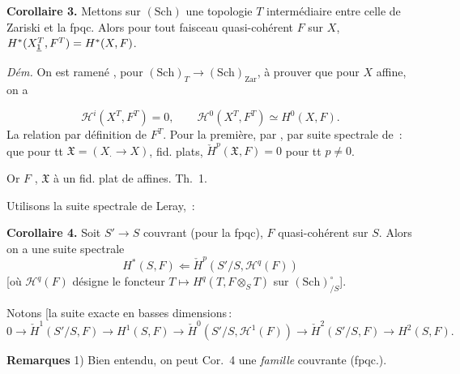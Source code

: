 \documentclass[11pt,a4paper]{article}
\begin{document}
\textbf{Corollaire 3.} Mettons sur $(\mathrm{Sch})$ une topologie $T$
intermédiaire entre celle de Zariski et la fpqc. Alors pour tout faisceau
quasi-cohérent $F$ sur $X$, $H^{*}(X^{T}_{\uncertain{\scriptstyle 1}}, F^{T})
= H^{*}(X, F)$.

\emph{Dém.} On est ramené , pour
$(\mathrm{Sch})_{T} \to (\mathrm{Sch})_{\mathrm{Zar}}$, à prouver que pour
$X$  affine, on a


\[
  \mathcal{H}^i(X^{T}, F^{T}) = 0, \qquad
  \mathcal{H}^0(X^{T}, F^{T}) \simeq H^0(X, F).
\]
 La \struck{\ill{}} relation  par
définition de $F^{T}$. Pour la première, \struck{\ill{}} \ill{}
 par \ill{} \ill{}, \ill{} \ill{} \ill{} par suite
spectrale de \,:  que pour tt
 \struck{\ill{}} \ill{} 
$\mathfrak{X} = (X_{\cdot} \to X)$, fid. plats,
$\check{H}^p(\mathfrak{X}, F) = 0$ pour tt $p \neq 0$.

Or \ill{} $F$ \ill{} \ill{} \ill{} \ill{}, 
 $\mathfrak{X}$ \ill{}  à un
 fid. plat  de 
affines.    \ill{} 
Th.~1.

Utilisons la suite spectrale de Leray, \ill{}\,:

\textbf{Corollaire 4.} Soit $S' \to S$ couvrant (pour la 
fpqc), $F$ quasi-cohérent sur $S$. Alors on a une suite spectrale
\[
  H^{*}(S, F) \Longleftarrow \check{H}^p(S'/S, \mathcal{H}^q(F))
\]
[où $\mathcal{H}^q(F)$ désigne le foncteur $T \mapsto H^q(T, F \otimes_S T)$
sur $(\mathrm{Sch})^{\circ}_{/S}$].



Notons [la suite exacte en basses dimensions\,:
\[
  0 \to \check{H}^1(S'/S, F) \to H^1(S, F) \to
  \check{H}^0(S'/S, \mathcal{H}^1(F)) \to \check{H}^2(S'/S, F) \to
  H^2(S, F) .
\]

\textbf{Remarques} 1) Bien entendu, on peut  Cor.~4
\ill{}  une \emph{famille} couvrante (fpqc.).
\end{document}
